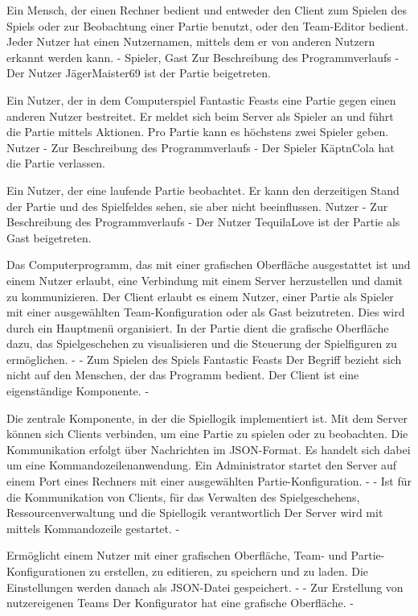 {Ein Mensch, der einen Rechner bedient und entweder den Client zum Spielen des Spiels oder zur Beobachtung einer Partie benutzt, oder den Team-Editor bedient. Jeder Nutzer hat einen Nutzernamen, mittels dem er von anderen Nutzern erkannt werden kann.}
{-}
{Spieler, Gast}
{Zur Beschreibung des Programmverlaufs}
{-}
{Der Nutzer \glqq{}JägerMaister69\grqq{} ist der Partie beigetreten.}

{Ein Nutzer, der in dem Computerspiel \glqq{}Fantastic Feasts\grqq{} eine Partie gegen einen anderen Nutzer bestreitet. Er meldet sich beim Server als Spieler an und führt die Partie mittels Aktionen. Pro Partie kann es höchstens zwei Spieler geben.}
{Nutzer}
{-}
{Zur Beschreibung des Programmverlaufs}
{-}
{Der Spieler \glqq{}KäptnCola\grqq{} hat die Partie verlassen.}

{Ein Nutzer, der eine laufende Partie beobachtet. Er kann den derzeitigen Stand der Partie und des Spielfeldes sehen, sie aber nicht beeinflussen.}
{Nutzer}
{-}
{Zur Beschreibung des Programmverlaufs}
{-}
{Der Nutzer \glqq{}TequilaLove\grqq{} ist der Partie als Gast beigetreten.}

{Das Computerprogramm, das mit einer grafischen Oberfläche ausgestattet ist und einem Nutzer erlaubt, eine Verbindung mit einem Server herzustellen und damit zu kommunizieren. Der Client erlaubt es einem Nutzer, einer Partie als Spieler mit einer ausgewählten Team-Konfiguration oder als Gast beizutreten. Dies wird durch ein Hauptmenü organisiert. In der Partie dient die grafische Oberfläche dazu, das Spielgeschehen zu visualisieren und die Steuerung der Spielfiguren zu ermöglichen.}
{-}
{-}
{Zum Spielen des Spiels \glqq{}Fantastic Feasts\grqq{}}
{Der Begriff bezieht sich nicht auf den Menschen, der das Programm bedient. Der Client ist eine eigenständige Komponente.}
{-}

{Die zentrale Komponente, in der die Spiellogik implementiert ist. Mit dem Server können sich Clients verbinden, um eine Partie zu spielen oder zu beobachten. Die Kommunikation erfolgt über Nachrichten im JSON-Format. Es handelt sich dabei um eine Kommandozeilenanwendung. Ein Administrator startet den Server auf einem Port eines Rechners mit einer ausgewählten Partie-Konfiguration.}
{-}
{-}
{Ist für die Kommunikation von Clients, für das Verwalten des Spielgeschehens, Ressourcenverwaltung und die Spiellogik verantwortlich}
{Der Server wird mit mittels Kommandozeile gestartet.}
{-}

{Ermöglicht einem Nutzer mit einer grafischen Oberfläche, Team- und Partie-Konfigurationen zu erstellen, zu editieren, zu speichern und zu laden. Die Einstellungen werden danach als JSON-Datei gespeichert.}
{-}
{-}
{Zur Erstellung von nutzereigenen Teams}
{Der Konfigurator hat eine grafische Oberfläche.}
{-}

